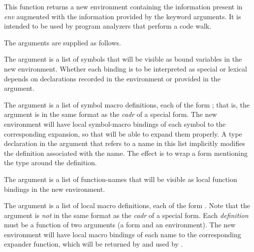 \begin{newer}
\begin{defun}[Function]
  This function returns a new environment containing the information present in
  \emph{env} augmented with the information provided by the keyword arguments.  It is
  intended to be used by program analyzers that perform a code walk.

  The arguments are supplied as follows.
\begin{flushdesc}
\item[\cd{:variable}]
     The argument is a list of symbols that will be visible as bound variables in
                the new environment.  Whether each binding is to be interpreted
                as special or lexical depends on  declarations recorded
                in the environment or provided in the  argument.

\item[\cd{:symbol-macro}]
 The argument is a list of symbol macro definitions, each of the form
                ; that is, the argument is
                in the same format as the
                \emph{cadr} of a  special form.  The new environment
                will have local symbol-macro bindings of each symbol to the
                corresponding expansion, so that  will be able to
                expand them properly.  A type declaration in the 
                argument that refers to a name in this list implicitly
                modifies the definition associated with the name.  The effect
                is to wrap a  form mentioning the type around the
                definition.

\item[\cd{:function}]
     The argument is a list of function-names that will be visible as local
                function bindings in the new environment.

\item[\cd{:macro}]
        The argument is a list of local macro definitions, 
        each of the form .
        Note that the argument is \emph{not}
                in the same format as the
                \emph{cadr} of a  special form.
                Each \emph{definition} must be a function of two
                arguments (a form and an environment).  The new environment
                will have local macro bindings of each name to the
                corresponding expander function, which will be returned by
                 and used by .


\end{flushdesc}
\end{defun}
\end{newer}
